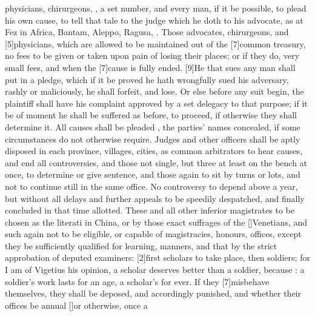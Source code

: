 {physicians, chirurgeons, \etc{}, a set number, and every man, if it
be possible, to plead his own cause, to tell that tale to the judge
which he doth to his advocate, as at Fez in Africa, Bantam, Aleppo,
Ragusa, . Those advocates,
chirurgeons, and [5\baselineskip]physicians, which are allowed to be maintained
out of the [7\baselineskip]common treasury, no fees to be given or taken upon pain
of losing their places; or if they do, very small fees, and when the
[7\baselineskip]cause is fully ended. [9\baselineskip]He that sues any man shall put in a
pledge, which if it be proved he hath wrongfully sued his adversary,
rashly or maliciously, he shall forfeit, and lose. Or else before any
suit begin, the plaintiff shall have his complaint approved by a set
delegacy to that purpose; if it be of moment he shall be suffered as
before, to proceed, if otherwise they shall determine it. All causes
shall be pleaded , the parties' names concealed, if
some circumstances do not otherwise require. Judges and other officers
shall be aptly disposed in each province, villages, cities, as common
arbitrators to hear causes, and end all controversies, and those not
single, but three at least on the bench at once, to determine or give
sentence, and those again to sit by turns or lots, and not to continue
still in the same office. No controversy to depend above a year, but
without all delays and further appeals to be speedily despatched, and
finally concluded in that time allotted. These and all other inferior
magistrates to be chosen as the literati in China, or by those
exact suffrages of the [\baselineskip]Venetians, and such again not to be
eligible, or capable of magistracies, honours, offices, except they be
sufficiently qualified for learning, manners, and that by the
strict approbation of deputed examiners: [2\baselineskip]first scholars to take
place, then soldiers; for I am of Vigetius his opinion, a scholar
deserves better than a soldier, because : a
soldier's work lasts for an age, a scholar's for ever. If they
[7\baselineskip]misbehave themselves, they shall be deposed, and accordingly
punished, and whether their offices be annual [\baselineskip]or otherwise, once a
}
